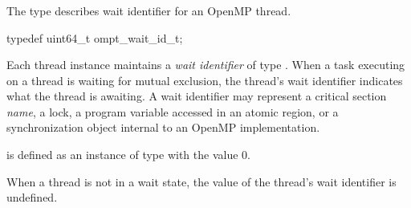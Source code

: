 \subsubsection{}

\label{sec:ompt_wait_id_t}

\summary

The  type describes wait identifier for an OpenMP thread.



\format
\begin{ccppspecific}
\begin{omptOther}
typedef uint64_t ompt_wait_id_t;
\end{omptOther}
\end{ccppspecific}

\descr

Each thread instance maintains a \emph{wait identifier} of type .
When a task executing on a thread is waiting for mutual exclusion, the thread's wait identifier indicates what the thread is awaiting.
A wait identifier may represent a critical section {\em name}, a lock, a program variable accessed in an atomic region, or a synchronization object internal to an OpenMP implementation.

 is defined as an instance of type  with the 
value 0.


When a thread is not in a wait state, the value of the thread's wait identifier is undefined.

